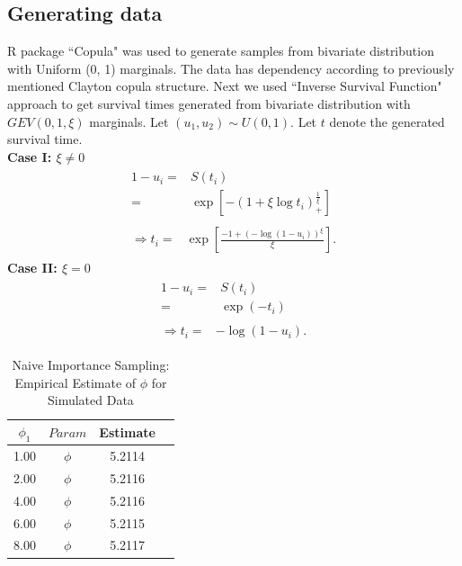 \documentclass[11pt]{article}
\theoremstyle{remboldstyle}
\begin{document}
\subsection{Generating data}
\noindent
R package ``Copula" was used to generate samples from bivariate distribution with Uniform (0, 1) marginals. The data has dependency according to previously mentioned Clayton copula structure. Next we used ``Inverse Survival Function" approach to get survival times generated from bivariate distribution with $GEV(0,1, \xi)$ marginals. Let $(u_1, u_2) \sim U(0, 1)$. Let $t$ denote the generated survival time. \\
\textbf{Case I: $\xi \neq 0$}
\begin{align}
\begin{split}
1 - u_i = {} &  S(t_i) \\
          = & \exp[-(1 + \xi \log t_i)_{+}^{\frac{1}{\xi}}]
\end{split}\\
\begin{split}
\Rightarrow t_i = {} & \exp[\frac{- 1 + (-\log(1 - u_i))^{\xi}}{\xi}].
\end{split}
\end{align}
\textbf{Case II: $\xi = 0$}
\begin{align}
\begin{split}
1 - u_i = {} &  S(t_i) \\
          = & \exp(-t_i)
\end{split}\\
\begin{split}
\Rightarrow t_i = {} & - \log(1 - u_i).
\end{split}
\end{align}
\begin{table}[H]
\caption{Naive Importance Sampling: Empirical Estimate of $\phi$ for Simulated Data}
\centering
\begin{tabular}{c c c c}
\hline
$\phi_{1}$ & $Param$      & Estimate\\
\hline
1.00          & $\phi$ & 5.2114\\
2.00          & $\phi$ & 5.2116 \\
4.00          & $\phi$ & 5.2116 \\
6.00          & $\phi$ & 5.2115\\
8.00         & $\phi$ & 5.2117 \\
              \hline             
\end{tabular}
\label{tab11}
\end{table}
\end{document}
